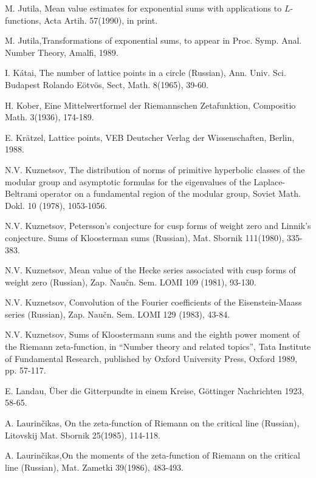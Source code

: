\begin{thebibliography}{99}
 M. Jutila, Mean value estimates for exponential sums with applications to $L$-functions, Acta Artih. 57(1990), in print.

 M. Jutila,\pageoriginale Transformations of exponential sums, to appear in Proc. Symp. Anal. Number Theory, Amalfi, 1989.

 I. K\'atai, The number of lattice points in a circle (Russian), Ann. Univ. Sci. Budapest Rolando E\"otv\"os, Sect, Math. 8(1965), 39-60.

 H. Kober, Eine Mittelwertformel der Riemannschen Zetafunktion, Compositio Math. 3(1936), 174-189.

 E. Kr\"atzel, Lattice points, VEB Deutscher Verlag der Wissenschaften, Berlin, 1988.

 N.V. Kuznetsov, The distribution of norms of primitive hyperbolic classes of the modular group and asymptotic formulas for the eigenvalues of the Laplace-Beltrami operator on a fundamental region of the modular group, Soviet Math. Dokl. 10 (1978), 1053-1056.

 N.V. Kuznetsov, Petersson's conjecture for cusp forms of weight zero and Linnik's conjecture. Sums of Kloosterman sums (Russian), Mat. Sbornik 111(1980), 335-383.

 N.V. Kuznetsov, Mean value of the Hecke series associated with cusp forms of weight zero (Russian), Zap. Nau\v cn. Sem. LOMI 109 (1981), 93-130.

 N.V. Kuznetsov, Convolution of the Fourier coefficients of the Eisenstein-Maass series (Russian), Zap. Nau\v cn. Sem. LOMI 129 (1983), 43-84.

 N.V. Kuznetsov, Sums of Kloostermann sums and the eighth power moment of the Riemann zeta-function, in ``Number theory and related topics'', Tata Institute of Fundamental Research, published by Oxford University Press, Oxford 1989, pp. 57-117.

 E. Landau, \"Uber die Gitterpundte in einem Kreise, G\"ottinger Nachrichten 1923, 58-65.

 A. Laurin\v cikas, On the zeta-function of Riemann on the critical line (Russian), Litovskij Mat. Sbornik 25(1985), 114-118.

 A. Laurin\v cikas,\pageoriginale On the moments of the zeta-function of Riemann on the critical line (Russian), Mat. Zametki 39(1986), 483-493.


\end{thebibliography}
